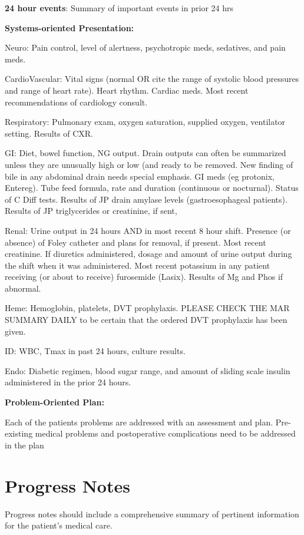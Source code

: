 \documentclass[
]{book}
\begin{document}
\textbf{24 hour events}: Summary of important events in prior 24 hrs

\textbf{Systems-oriented Presentation:}

Neuro: Pain control, level of alertness, psychotropic meds, sedatives, and pain meds.

CardioVascular: Vital signs (normal OR cite the range of systolic blood pressures and range of heart rate). Heart rhythm. Cardiac meds. Most recent recommendations of cardiology consult.

Respiratory: Pulmonary exam, oxygen saturation, supplied oxygen, ventilator setting. Results of CXR.

GI: Diet, bowel function, NG output. Drain outputs can often be summarized unless they are unusually high or low (and ready to be removed. New finding of bile in any abdominal drain needs special emphasis. GI meds (eg protonix, Entereg). Tube feed formula, rate and duration (continuous or nocturnal). Status of C Diff tests. Results of JP drain amylase levels (gastroesophageal patients). Results of JP triglycerides or creatinine, if sent,

Renal: Urine output in 24 hours AND in most recent 8 hour shift. Presence (or absence) of Foley catheter and plans for removal, if present. Most recent creatinine. If diuretics administered, dosage and amount of urine output during the shift when it was administered. Most recent potassium in any patient receiving (or about to receive) furosemide (Lasix). Results of Mg and Phos if abnormal.

Heme: Hemoglobin, platelets, DVT prophylaxis. PLEASE CHECK THE MAR SUMMARY DAILY to be certain that the ordered DVT prophylaxis has been given.

ID: WBC, Tmax in past 24 hours, culture results.

Endo: Diabetic regimen, blood sugar range, and amount of sliding scale insulin administered in the prior 24 hours.

\textbf{Problem-Oriented Plan:}

Each of the patients problems are addressed with an assessment and plan. Pre-existing medical problems and postoperative complications need to be addressed in the plan

\hypertarget{progress-notes}{%
\chapter{Progress Notes}\label{progress-notes}}

Progress notes should include a comprehensive summary of pertinent information for the patient's medical care.
\end{document}
